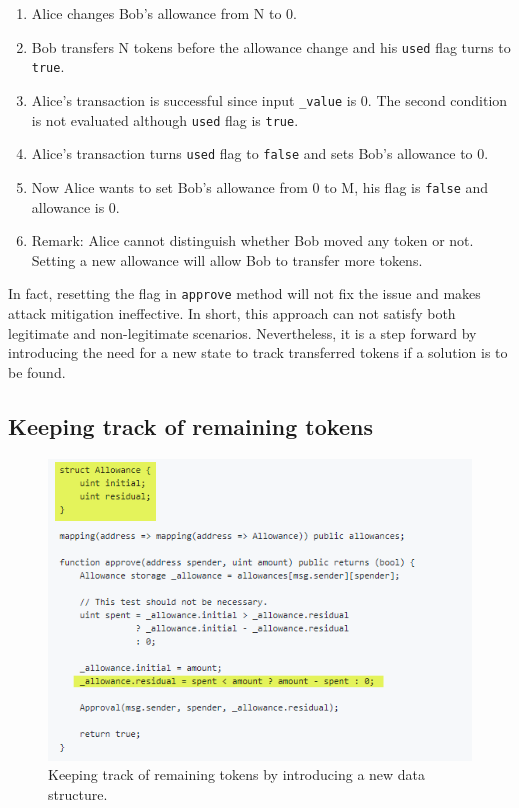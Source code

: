 \begin{enumerate}
	\item Alice changes Bob's allowance from N to 0.
	\item Bob transfers N tokens before the allowance change and his \texttt{used} flag turns to \texttt{true}.
	\item Alice's transaction is successful since input \texttt{\_value} is 0. The second condition is not evaluated although \texttt{used} flag is \texttt{true}.
	\item Alice's transaction turns \texttt{used} flag to \texttt{false} and sets Bob's allowance to 0. 
	\item Now Alice wants to set Bob's allowance from 0 to M, his flag is \texttt{false} and allowance is 0. 
	\item Remark: Alice cannot distinguish whether Bob moved any token or not. Setting a new allowance will allow Bob to transfer more tokens.
\end{enumerate}

In fact, resetting the flag in \texttt{approve} method will not fix the issue and makes attack mitigation ineffective. In short, this approach can not satisfy both legitimate and non-legitimate scenarios. Nevertheless, it is a step forward by introducing the need for a new state to track transferred tokens if a solution is to be found.


\subsection{Keeping track of remaining tokens}

\begin{figure}[t]
	\centering
	\includegraphics[width=1.0\linewidth]{figures/multiple_withdrawal_29.png}
	\caption{Keeping track of remaining tokens by introducing a new data structure.\label{fig:track}}
\end{figure}

